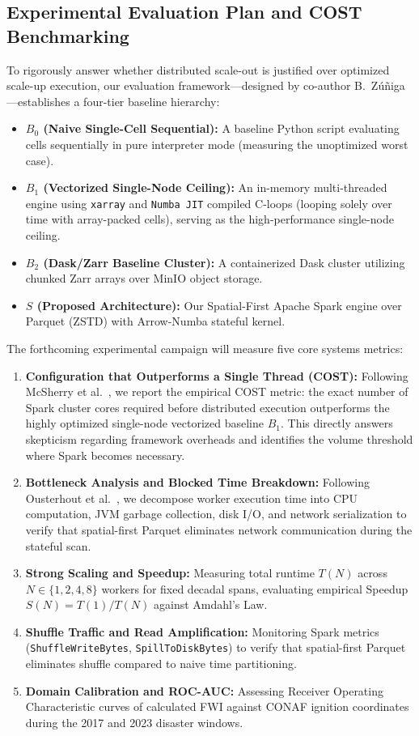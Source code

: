 \documentclass[10pt,conference]{IEEEtran}
\begin{document}
\subsection{Experimental Evaluation Plan and COST Benchmarking}
To rigorously answer whether distributed scale-out is justified over optimized scale-up execution, our evaluation framework---designed by co-author B.~Z\'u\~niga---establishes a four-tier baseline hierarchy:
\begin{itemize}
    \item \textbf{$B_0$ (Naive Single-Cell Sequential):} A baseline Python script evaluating cells sequentially in pure interpreter mode (measuring the unoptimized worst case).
    \item \textbf{$B_1$ (Vectorized Single-Node Ceiling):} An in-memory multi-threaded engine using \texttt{xarray} and \texttt{Numba JIT} compiled C-loops (looping solely over time with array-packed cells), serving as the high-performance single-node ceiling.
    \item \textbf{$B_2$ (Dask/Zarr Baseline Cluster):} A containerized Dask cluster utilizing chunked Zarr arrays over MinIO object storage.
    \item \textbf{$S$ (Proposed Architecture):} Our Spatial-First Apache Spark engine over Parquet (ZSTD) with Arrow-Numba stateful kernel.
\end{itemize}

The forthcoming experimental campaign will measure five core systems metrics:
\begin{enumerate}
    \item \textbf{Configuration that Outperforms a Single Thread (COST):} Following McSherry et al.~\cite{mcsherry2015scalability}, we report the empirical COST metric: the exact number of Spark cluster cores required before distributed execution outperforms the highly optimized single-node vectorized baseline $B_1$. This directly answers skepticism regarding framework overheads and identifies the volume threshold where Spark becomes necessary.
    \item \textbf{Bottleneck Analysis and Blocked Time Breakdown:} Following Ousterhout et al.~\cite{ousterhout2015making}, we decompose worker execution time into CPU computation, JVM garbage collection, disk I/O, and network serialization to verify that spatial-first Parquet eliminates network communication during the stateful scan.
    \item \textbf{Strong Scaling and Speedup:} Measuring total runtime $T(N)$ across $N \in \{1, 2, 4, 8\}$ workers for fixed decadal spans, evaluating empirical Speedup $S(N) = T(1)/T(N)$ against Amdahl's Law.
    \item \textbf{Shuffle Traffic and Read Amplification:} Monitoring Spark metrics (\texttt{ShuffleWriteBytes}, \texttt{SpillToDiskBytes}) to verify that spatial-first Parquet eliminates shuffle compared to naive time partitioning.
    \item \textbf{Domain Calibration and ROC-AUC:} Assessing Receiver Operating Characteristic curves of calculated FWI against CONAF ignition coordinates during the 2017 and 2023 disaster windows.
\end{enumerate}
\end{document}
